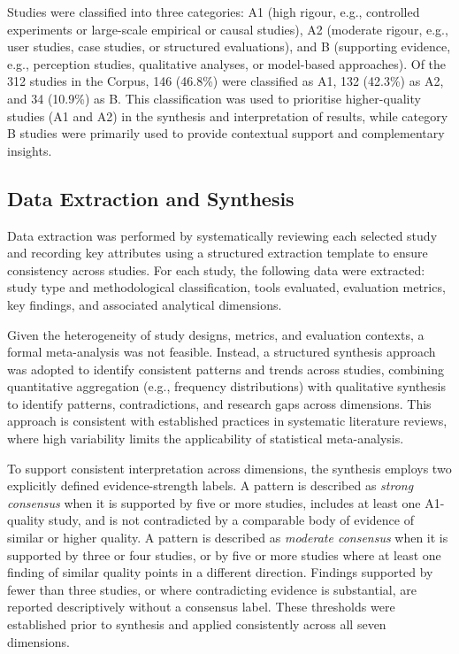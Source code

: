 Studies were classified into three categories: A1 (high rigour, e.g., controlled experiments or large-scale empirical or causal studies), A2 (moderate rigour, e.g., user studies, case studies, or structured evaluations), and B (supporting evidence, e.g., perception studies, qualitative analyses, or model-based approaches). Of the 312 studies in the Corpus, 146 (46.8\%) were classified as A1, 132 (42.3\%) as A2, and 34 (10.9\%) as B. This classification was used to prioritise higher-quality studies (A1 and A2) in the synthesis and interpretation of results, while category B studies were primarily used to provide contextual support and complementary insights.

\subsection{Data Extraction and Synthesis}
\label{sec:data-extraction}
Data extraction was performed by systematically reviewing each selected study and recording key attributes using a structured extraction template to ensure consistency across studies. For each study, the following data were extracted: study type and methodological classification, tools evaluated, evaluation metrics, key findings, and associated analytical dimensions.

Given the heterogeneity of study designs, metrics, and evaluation contexts, a formal meta-analysis was not feasible. Instead, a structured synthesis approach was adopted to identify consistent patterns and trends across studies, combining quantitative aggregation (e.g., frequency distributions) with qualitative synthesis to identify patterns, contradictions, and research gaps across dimensions. This approach is consistent with established practices in systematic literature reviews, where high variability limits the applicability of statistical meta-analysis.

To support consistent interpretation across dimensions, the synthesis employs two explicitly defined evidence-strength labels. A pattern is described as \textit{strong consensus} when it is supported by five or more studies, includes at least one A1-quality study, and is not contradicted by a comparable body of evidence of similar or higher quality. A pattern is described as \textit{moderate consensus} when it is supported by three or four studies, or by five or more studies where at least one finding of similar quality points in a different direction. Findings supported by fewer than three studies, or where contradicting evidence is substantial, are reported descriptively without a consensus label. These thresholds were established prior to synthesis and applied consistently across all seven dimensions.

